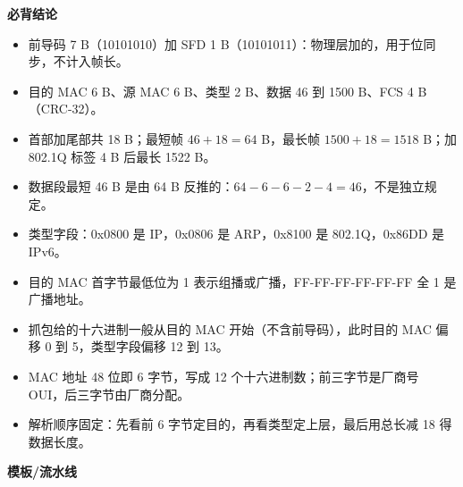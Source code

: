 \documentclass[10pt,a4paper]{ctexart}
\begin{document}



\textbf{必背结论}

\begin{itemize}

\item 前导码 7 B（10101010）加 SFD 1 B（10101011）：物理层加的，用于位同步，不计入帧长。

\item 目的 MAC 6 B、源 MAC 6 B、类型 2 B、数据 46 到 1500 B、FCS 4 B（CRC-32）。

\item 首部加尾部共 18 B；最短帧 $46 + 18 = 64$ B，最长帧 $1500 + 18 = 1518$ B；加 802.1Q 标签 4 B 后最长 1522 B。

\item 数据段最短 46 B 是由 64 B 反推的：$64 - 6 - 6 - 2 - 4 = 46$，不是独立规定。

\item 类型字段：0x0800 是 IP，0x0806 是 ARP，0x8100 是 802.1Q，0x86DD 是 IPv6。

\item 目的 MAC 首字节最低位为 1 表示组播或广播，FF-FF-FF-FF-FF-FF 全 1 是广播地址。

\item 抓包给的十六进制一般从目的 MAC 开始（不含前导码），此时目的 MAC 偏移 0 到 5，类型字段偏移 12 到 13。

\item MAC 地址 48 位即 6 字节，写成 12 个十六进制数；前三字节是厂商号 OUI，后三字节由厂商分配。

\item 解析顺序固定：先看前 6 字节定目的，再看类型定上层，最后用总长减 18 得数据长度。

\end{itemize}


\textbf{模板/流水线}
\end{document}
